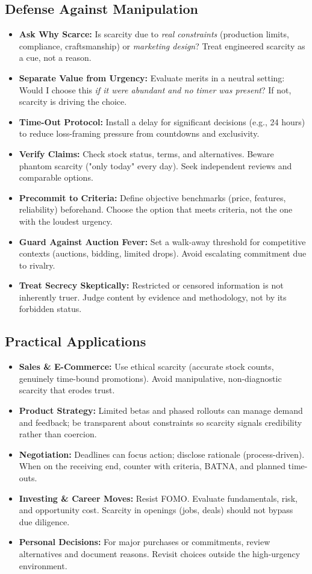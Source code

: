 \subsection*{Defense Against Manipulation}
\begin{itemize}
    \item \textbf{Ask Why Scarce:} Is scarcity due to \emph{real constraints} (production limits, compliance, craftsmanship) or \emph{marketing design}? Treat engineered scarcity as a cue, not a reason.
    \item \textbf{Separate Value from Urgency:} Evaluate merits in a neutral setting: Would I choose this \emph{if it were abundant and no timer was present}? If not, scarcity is driving the choice.
    \item \textbf{Time-Out Protocol:} Install a delay for significant decisions (e.g., 24 hours) to reduce loss-framing pressure from countdowns and exclusivity.
    \item \textbf{Verify Claims:} Check stock status, terms, and alternatives. Beware phantom scarcity ("only today" every day). Seek independent reviews and comparable options.
    \item \textbf{Precommit to Criteria:} Define objective benchmarks (price, features, reliability) beforehand. Choose the option that meets criteria, not the one with the loudest urgency.
    \item \textbf{Guard Against Auction Fever:} Set a walk-away threshold for competitive contexts (auctions, bidding, limited drops). Avoid escalating commitment due to rivalry.
    \item \textbf{Treat Secrecy Skeptically:} Restricted or censored information is not inherently truer. Judge content by evidence and methodology, not by its forbidden status.
\end{itemize}

\subsection*{Practical Applications}
\begin{itemize}
    \item \textbf{Sales \& E-Commerce:} Use ethical scarcity (accurate stock counts, genuinely time-bound promotions). Avoid manipulative, non-diagnostic scarcity that erodes trust.
    \item \textbf{Product Strategy:} Limited betas and phased rollouts can manage demand and feedback; be transparent about constraints so scarcity signals credibility rather than coercion.
    \item \textbf{Negotiation:} Deadlines can focus action; disclose rationale (process-driven). When on the receiving end, counter with criteria, BATNA, and planned time-outs.
    \item \textbf{Investing \& Career Moves:} Resist FOMO. Evaluate fundamentals, risk, and opportunity cost. Scarcity in openings (jobs, deals) should not bypass due diligence.
    \item \textbf{Personal Decisions:} For major purchases or commitments, review alternatives and document reasons. Revisit choices outside the high-urgency environment.
\end{itemize}

